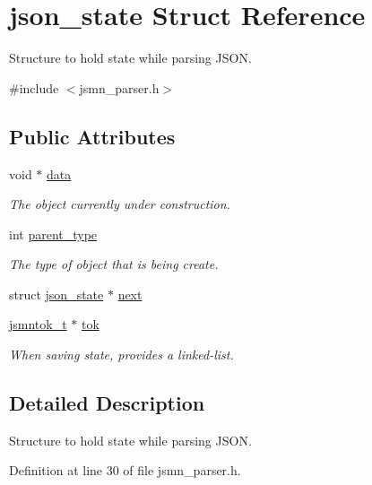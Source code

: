 \hypertarget{structjson__state}{\section{json\-\_\-state Struct Reference}
\label{structjson__state}
}


Structure to hold state while parsing J\-S\-O\-N.  




{\ttfamily \#include $<$jsmn\-\_\-parser.\-h$>$}

\subsection*{Public Attributes}
\begin{DoxyCompactItemize}
\item 
void $\ast$ \hyperlink{structjson__state_acc079826c9aec290370460c6a5b0cdc8}{data}
\begin{DoxyCompactList}\small\item\em The object currently under construction. \end{DoxyCompactList}\item 
int \hyperlink{structjson__state_a89afcce72accc1241265f843ec7d6f40}{parent\-\_\-type}
\begin{DoxyCompactList}\small\item\em The type of object that is being create. \end{DoxyCompactList}\item 
struct \hyperlink{structjson__state}{json\-\_\-state} $\ast$ \hyperlink{structjson__state_a62a49f4c9101a8e5a93a757c74060b25}{next}
\item 
\hyperlink{structjsmntok__t}{jsmntok\-\_\-t} $\ast$ \hyperlink{structjson__state_a4b6bd5d26604be1ca0783f1b36c01a9f}{tok}
\begin{DoxyCompactList}\small\item\em When saving state, provides a linked-\/list. \end{DoxyCompactList}\end{DoxyCompactItemize}


\subsection{Detailed Description}
Structure to hold state while parsing J\-S\-O\-N. 

Definition at line 30 of file jsmn\-\_\-parser.\-h.




